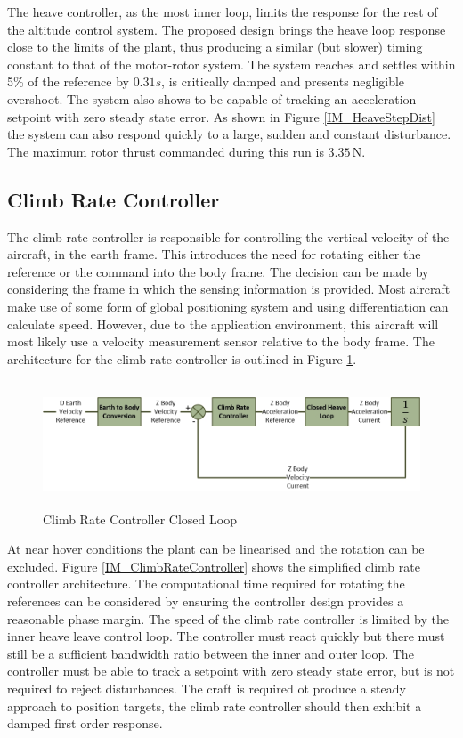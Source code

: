 		 The heave controller, as the most inner loop, limits the response for the rest of the altitude control system. The proposed design brings the heave loop response close to the limits of the plant, thus producing a similar (but slower) timing constant to that of the motor-rotor system. The system reaches and settles within 5\% of the reference by $0.31s$, is critically damped and presents negligible overshoot. The system also shows to be capable of tracking an acceleration setpoint with zero steady state error. As shown in Figure \ref{IM_HeaveStepDist} the system can also respond quickly to a large, sudden and constant disturbance. The maximum rotor thrust commanded during this run is $3.35$\,N. 
	 
	 \subsection{Climb Rate Controller}
	 The climb rate controller is responsible for controlling the vertical velocity of the aircraft, in the earth frame. This introduces the need for rotating either the reference or the command into the body frame. The decision can be made by considering the frame in which the sensing information is provided. Most aircraft make use of some form of global positioning system and using differentiation can calculate speed. However, due to the application environment, this aircraft will most likely use a velocity measurement sensor relative to the body frame. The architecture for the climb rate controller is outlined in Figure \ref{IM_ClimbRateControlLoop}. 
	 
	 \begin{figure}[H]
	 	\centering
	 	\includegraphics[height = 3.75cm]{../References/Diagrams/ClimbRateLoop.jpg}
	 	\caption{Climb Rate Controller Closed Loop}
	 	\label{IM_ClimbRateControlLoop}
	 \end{figure}
	 
	 At near hover conditions the plant can be linearised and the rotation can be excluded. Figure \ref{IM_ClimbRateController} shows the simplified climb rate controller architecture. The computational time required for rotating the references can be considered by ensuring the controller design provides a reasonable phase margin. The speed of the climb rate controller is limited by the inner heave leave control loop. The controller must react quickly but there must still be a sufficient bandwidth ratio between the inner and outer loop. The controller must be able to track a setpoint with zero steady state error, but is not required to reject disturbances. The craft is required ot produce a steady approach to position targets, the climb rate controller should then exhibit a damped first order response.
	 
